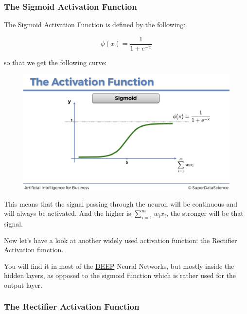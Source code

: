 \documentclass[]{book}
\begin{document}
\newpage

\subsubsection{The Sigmoid Activation Function}

The Sigmoid Activation Function is defined by the following:

\begin{equation*}
\phi(x) = \frac{1}{1+e^{-x}}
\end{equation*}

so that we get the following curve:

\begin{figure}[!htbp]
        \begin{center}
            \includegraphics[scale=0.18]{ANN_11.png}
        \end{center}
\end{figure}

This means that the signal passing through the neuron will be continuous and will always be activated. And the higher is \(\sum_{i=1}^m w_i x_i\), the stronger will be that signal.

Now let's have a look at another widely used activation function: the Rectifier Activation function.

You will find it in most of the \underline{DEEP} Neural Networks, but mostly inside the hidden layers, as opposed to the sigmoid function which is rather used for the output layer.

\newpage

\subsubsection{The Rectifier Activation Function}
\end{document}
